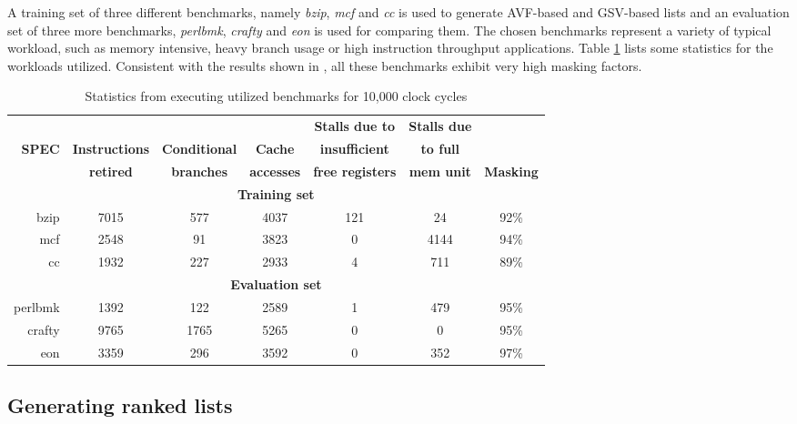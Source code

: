 \documentclass[12pt]{yalephd}
\begin{document}
A training set of three different benchmarks, namely \textit{bzip}, \textit{mcf} and \textit{cc} is used to generate AVF-based and GSV-based lists and an evaluation set of three more benchmarks, \textit{perlbmk}, \textit{crafty} and \textit{eon} is used for comparing them. The chosen benchmarks represent a variety of typical workload, such as memory intensive, heavy branch usage or high instruction throughput applications. Table \ref{sC4tSPEC_stats} lists some statistics for the workloads utilized. Consistent with the results shown in \cite{WMP07}, all these benchmarks exhibit very high masking factors.

\begin{table}[!ht]
\caption{Statistics from executing utilized benchmarks for 10,000 clock cycles}\label{sC4tSPEC_stats}
\tabcolsep=0.10cm
\footnotesize
\begin{center}
\begin{tabular}{||r|c|c|c|c|c||c||}
\hline
\hline
{\bf }      & {\bf}             & {\bf}             & \bf{}         & {\bf Stalls due to}      & {\bf Stalls due}  & {}\\
{\bf SPEC} & {\bf Instructions}& {\bf Conditional} & \bf{Cache}    & {\bf insufficient}   & {\bf to full}     & {\bf }\\
{\bf }      & {\bf retired}     & {\bf branches}    & \bf{accesses} & {\bf free registers}  & {\bf mem unit} & {\bf Masking}\\
\hline
\multicolumn{7}{||c||}{\bf{Training set}}\\
\hline
bzip	&7015	&577	&4037	&121	&24   & 92\%\\
mcf	    &2548	&91	    &3823	&0	    &4144 & 94\%\\
cc	    &1932	&227	&2933	&4	    &711  & 89\%\\
\hline
\multicolumn{7}{||c||}{\bf{Evaluation set}}\\
\hline
perlbmk	&1392	&122	&2589	&1	    &479  & 95\%\\
crafty	&9765	&1765	&5265	&0	    &0    & 95\%\\
eon	    &3359	&296	&3592	&0	    &352  & 97\%\\
\hline
\hline
\end{tabular}
\end{center}
\end{table}

\subsection{Generating ranked lists}
\end{document}
